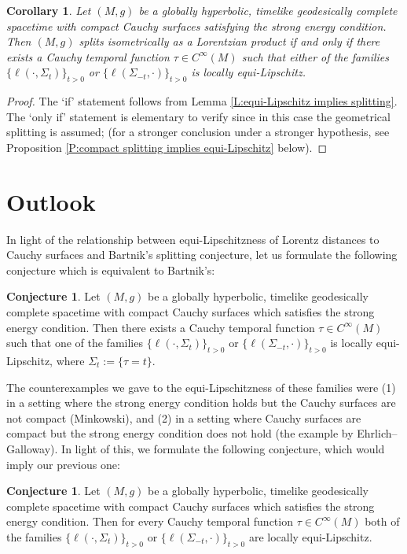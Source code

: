 \documentclass[a4paper,11pt]{article}
\numberwithin{equation}{section}
\theoremstyle{definition}
\newtheorem{Conjecture}[Definition]{Conjecture}
\theoremstyle{plain}
\newtheorem{Corollary}[Definition]{Corollary}
\begin{document}
\begin{Corollary}
\label{P:old}
    Let $(M,g)$ be a globally hyperbolic, timelike geodesically complete spacetime with compact Cauchy surfaces satisfying the strong energy condition. Then $(M,g)$ splits isometrically as a Lorentzian product if and only if there exists a Cauchy temporal function $\tau \in C^\infty(M)$ such that either of the families $\{\ell(\cdot,\Sigma_t)\}_{t > 0}$ or $\{\ell(\Sigma_{-t},\cdot)\}_{t > 0}$ is locally equi-Lipschitz.
\end{Corollary}
\begin{proof}
The `if' statement follows from Lemma \ref{L:equi-Lipschitz implies splitting}. 
The `only if' statement is elementary to verify since in this case the geometrical splitting is assumed;  (for a stronger conclusion under a stronger hypothesis,  see Proposition \ref{P:compact splitting implies equi-Lipschitz} below).
\end{proof}

\section{Outlook}
\label{section: outlook}

In light of the relationship between equi-Lipschitzness of Lorentz distances to Cauchy surfaces and Bartnik's splitting conjecture, let us formulate the following conjecture which is equivalent to Bartnik's:

\begin{Conjecture}
    Let $(M,g)$ be a globally hyperbolic, timelike geodesically complete spacetime with compact Cauchy surfaces which satisfies the strong energy condition. Then there exists a Cauchy temporal function $\tau \in C^\infty(M)$ such that one of the families $\{\ell(\cdot,\Sigma_t)\}_{t > 0}$ or $\{\ell(\Sigma_{-t},\cdot)\}_{t > 0}$ is locally equi-Lipschitz, where $\Sigma_t := \{\tau =t\}$.
\end{Conjecture}

The counterexamples we gave to the equi-Lipschitzness of these families were (1) in a setting where the strong energy condition holds but the Cauchy surfaces are not compact (Minkowski), and (2) in a setting where Cauchy surfaces are compact but the strong energy condition does not hold (the example by Ehrlich--Galloway). In light of this, we formulate the following conjecture, which would imply our previous one:

\begin{Conjecture}
    Let $(M,g)$ be a globally hyperbolic, timelike geodesically complete spacetime with compact Cauchy surfaces which satisfies the strong energy condition. Then for every Cauchy temporal function $\tau \in C^\infty(M)$ both of the families $\{\ell(\cdot,\Sigma_t)\}_{t > 0}$ or $\{\ell(\Sigma_{-t},\cdot)\}_{t > 0}$ are locally equi-Lipschitz.
\end{Conjecture}
\end{document}
